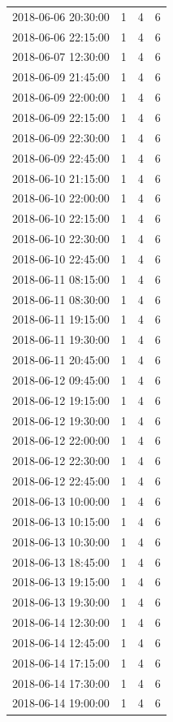 \begin{tabular}{lrrr}
2018-06-06 20:30:00 & 1 & 4 & 6 \\
2018-06-06 22:15:00 & 1 & 4 & 6 \\
2018-06-07 12:30:00 & 1 & 4 & 6 \\
2018-06-09 21:45:00 & 1 & 4 & 6 \\
2018-06-09 22:00:00 & 1 & 4 & 6 \\
2018-06-09 22:15:00 & 1 & 4 & 6 \\
2018-06-09 22:30:00 & 1 & 4 & 6 \\
2018-06-09 22:45:00 & 1 & 4 & 6 \\
2018-06-10 21:15:00 & 1 & 4 & 6 \\
2018-06-10 22:00:00 & 1 & 4 & 6 \\
2018-06-10 22:15:00 & 1 & 4 & 6 \\
2018-06-10 22:30:00 & 1 & 4 & 6 \\
2018-06-10 22:45:00 & 1 & 4 & 6 \\
2018-06-11 08:15:00 & 1 & 4 & 6 \\
2018-06-11 08:30:00 & 1 & 4 & 6 \\
2018-06-11 19:15:00 & 1 & 4 & 6 \\
2018-06-11 19:30:00 & 1 & 4 & 6 \\
2018-06-11 20:45:00 & 1 & 4 & 6 \\
2018-06-12 09:45:00 & 1 & 4 & 6 \\
2018-06-12 19:15:00 & 1 & 4 & 6 \\
2018-06-12 19:30:00 & 1 & 4 & 6 \\
2018-06-12 22:00:00 & 1 & 4 & 6 \\
2018-06-12 22:30:00 & 1 & 4 & 6 \\
2018-06-12 22:45:00 & 1 & 4 & 6 \\
2018-06-13 10:00:00 & 1 & 4 & 6 \\
2018-06-13 10:15:00 & 1 & 4 & 6 \\
2018-06-13 10:30:00 & 1 & 4 & 6 \\
2018-06-13 18:45:00 & 1 & 4 & 6 \\
2018-06-13 19:15:00 & 1 & 4 & 6 \\
2018-06-13 19:30:00 & 1 & 4 & 6 \\
2018-06-14 12:30:00 & 1 & 4 & 6 \\
2018-06-14 12:45:00 & 1 & 4 & 6 \\
2018-06-14 17:15:00 & 1 & 4 & 6 \\
2018-06-14 17:30:00 & 1 & 4 & 6 \\
2018-06-14 19:00:00 & 1 & 4 & 6 \\

\end{tabular}
